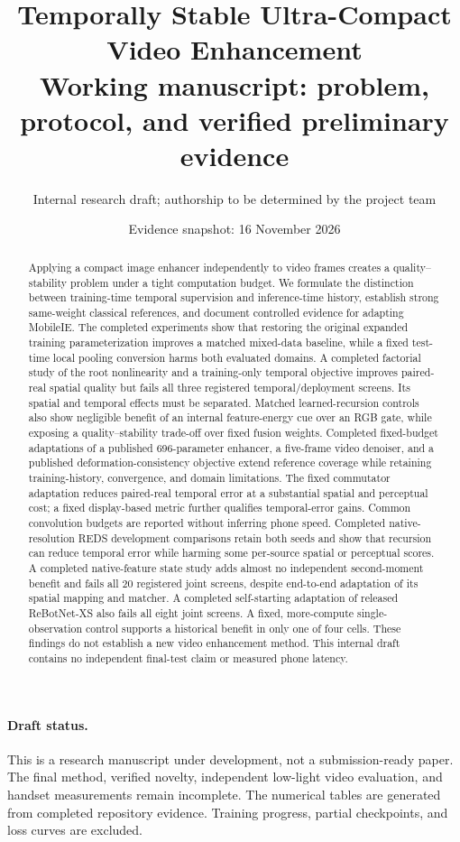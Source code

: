 \documentclass[11pt]{article}
\title{Temporally Stable Ultra-Compact Video Enhancement\\
\large Working manuscript: problem, protocol, and verified preliminary evidence}
\author{Internal research draft; authorship to be determined by the project team}
\date{Evidence snapshot: 16 November 2026}
\newcommand{\pending}[1]{\textcolor{red!65!black}{#1}}
\begin{document}
\maketitle
\begin{abstract}
Applying a compact image enhancer independently to video frames creates a
quality--stability problem under a tight computation budget. We formulate the
distinction between training-time temporal supervision and inference-time
history, establish strong same-weight classical references, and document
controlled evidence for adapting MobileIE. The completed experiments show that
restoring the original expanded training parameterization improves a matched
mixed-data baseline, while a fixed test-time local pooling conversion harms
both evaluated domains. A completed factorial study of the root nonlinearity
and a training-only temporal objective improves paired-real spatial quality
but fails all three registered temporal/deployment screens. Its spatial and
temporal effects must be separated. Matched learned-recursion controls also
show negligible benefit of an internal feature-energy cue over an RGB gate,
while exposing a quality--stability trade-off over fixed fusion weights.
Completed fixed-budget adaptations of a published 696-parameter enhancer,
a five-frame video denoiser, and a published deformation-consistency
objective extend reference coverage while retaining training-history,
convergence, and domain limitations. The fixed commutator adaptation
reduces paired-real temporal error at a substantial spatial and perceptual
cost; a fixed display-based metric further qualifies temporal-error gains.
Common convolution budgets are reported without inferring phone speed.
Completed native-resolution REDS development comparisons retain both seeds
and show that recursion can reduce temporal error while harming some
per-source spatial or perceptual scores.
A completed native-feature state study adds almost no independent
second-moment benefit and fails all 20 registered joint screens,
despite end-to-end adaptation of its spatial mapping and matcher.
A completed self-starting adaptation of released ReBotNet-XS also fails
all eight joint screens. A fixed, more-compute single-observation
control supports a historical benefit in only one of four cells.
These findings do not establish a new video enhancement method.
This internal draft contains no independent
final-test claim or measured phone latency.
\end{abstract}

\paragraph{Draft status.}
\pending{This is a research manuscript under development, not a submission-ready
paper. The final method, verified novelty, independent low-light video
evaluation, and handset measurements remain incomplete.}
The numerical tables are generated from completed repository evidence.
Training progress, partial checkpoints, and loss curves are excluded.
\end{document}
